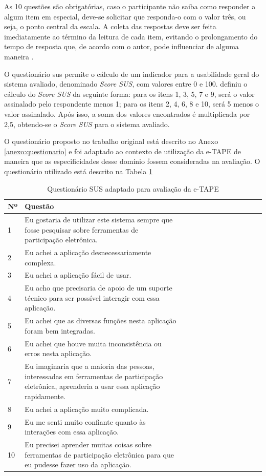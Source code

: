 \par
 As 10 questões são obrigatórias, caso o participante não saiba como responder a algum item em especial, deve-se solicitar que responda-o com o valor três, ou seja, o ponto central da escala. A coleta das respostas 
deve ser feita imediatamente ao término da leitura de cada item, evitando o prolongamento do tempo de resposta que, de acordo com o autor, pode influenciar de alguma maneira \cite{brooke1996sus}.

\par

O questionário \acrshort{sus} permite o cálculo de um indicador para a usabilidade geral do sistema avaliado, denominado \textit{Score SUS}, com valores entre 0 e 100. 
 definiu o cálculo do \textit{Score SUS} da seguinte forma:
para os itens 1, 3, 5, 7 e 9, será o valor assinalado pelo respondente menos 1; para os itens 2, 4, 6, 8 e 10, será 5 menos o valor assinalado. Após isso, a soma dos valores 
encontrados é multiplicada por 2,5, obtendo-se o \textit{Score SUS} para o sistema avaliado.

\par
O questionário proposto no trabalho original está descrito no Anexo \ref{anexo:questionario} e  foi adaptado ao contexto de utilização da e-TAPE de maneira que as especificidades desse domínio fossem consideradas na avaliação. O questionário utilizado está descrito na Tabela \ref{tab:questionario3}

\begin{table}[!ht]
    \centering
    \caption{Questionário SUS adaptado para avaliação da e-TAPE}
    \label{tab:questionario3}
    \begin{tabular}{l*{2}{>{\raggedright\arraybackslash}p{0.66\linewidth}}}
    \toprule
    Nº & Questão        \\
    \midrule
    1 & Eu gostaria de utilizar este sistema sempre que fosse pesquisar sobre ferramentas de participação eletrônica.\\
    2 & Eu achei a aplicação desnecessariamente complexa. \\
    3 & Eu achei a aplicação fácil de usar.\\
    4 & Eu acho que precisaria de apoio de um suporte técnico para ser possível interagir com essa aplicação.\\
    5 & Eu achei que as diversas funções nesta aplicação foram bem integradas. \\
    6 & Eu achei que houve muita inconsistência ou erros nesta aplicação. \\
    7 & Eu imaginaria que a maioria das pessoas, interessadas em ferramentas de participação eletrônica, aprenderia a usar essa aplicação rapidamente. \\
    8 & Eu achei a aplicação muito complicada. \\
    9 & Eu me senti muito confiante quanto às interações com essa aplicação. \\
    10 & Eu precisei aprender muitas coisas sobre ferramentas de participação eletrônica para que eu pudesse fazer uso da aplicação.\\
    \bottomrule
    \end{tabular}
\end{table}


